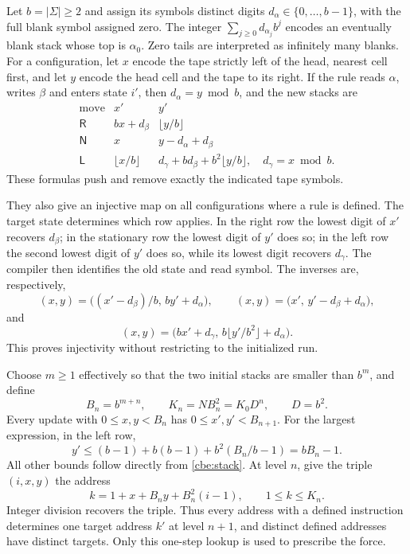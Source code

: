 Let $b=|\Sigma|\ge2$ and assign its symbols distinct digits
$d_\alpha\in\{0,\ldots,b-1\}$, with the full blank symbol assigned
zero.  The integer
$\sum_{j\ge0}d_{\alpha_j}b^j$ encodes an eventually blank stack whose
top is $\alpha_0$.  Zero tails are interpreted as infinitely many
blanks.  For a configuration, let $x$ encode the tape strictly left
of the head, nearest cell first, and let $y$ encode the head cell and
the tape to its right.  If the rule reads $\alpha$, writes $\beta$
and enters state $i'$, then $d_\alpha=y\bmod b$, and the new stacks are
\begin{equation}\label{cbe:stack}
\begin{array}{c|cc}
\text{move}&x'&y'\\ \hline
\mathsf R&bx+d_\beta&\lfloor y/b\rfloor\\
\mathsf N&x&y-d_\alpha+d_\beta\\
\mathsf L&\lfloor x/b\rfloor&
 d_\gamma+bd_\beta+b^2\lfloor y/b\rfloor,
 \quad d_\gamma=x\bmod b.
\end{array}
\end{equation}
These formulas push and remove exactly the indicated tape symbols.

They also give an injective map on all configurations where a rule
is defined.  The target state determines which row applies.  In the
right row the lowest digit of $x'$ recovers $d_\beta$; in the stationary
row the lowest digit of $y'$ does so; in the left row the second
lowest digit of $y'$ does so, while its lowest digit recovers
$d_\gamma$.  The compiler then identifies the old state and read
symbol.  The inverses are, respectively,
\[
 (x,y)=\bigl((x'-d_\beta)/b,\,by'+d_\alpha\bigr),\qquad
 (x,y)=\bigl(x',\,y'-d_\beta+d_\alpha\bigr),
\]
and
\[
 (x,y)=\bigl(bx'+d_\gamma,\,
                  b\lfloor y'/b^2\rfloor+d_\alpha\bigr).
\]
This proves injectivity without restricting to the initialized run.

Choose $m\ge1$ effectively so that the two initial stacks are smaller
than $b^m$, and define
\begin{equation}\label{cbe:counts}
 B_n=b^{m+n},\qquad K_n=NB_n^2=K_0D^n,\qquad D=b^2.
\end{equation}
Every update with $0\le x,y<B_n$ has $0\le x',y'<B_{n+1}$.
For the largest expression, in the left row,
\[
 y'\le(b-1)+b(b-1)+b^2(B_n/b-1)=bB_n-1.
\]
All other bounds follow directly from \eqref{cbe:stack}.
At level $n$, give the triple $(i,x,y)$ the address
\begin{equation}\label{cbe:address}
 k=1+x+B_ny+B_n^2(i-1),\qquad 1\le k\le K_n.
\end{equation}
Integer division recovers the triple.  Thus every address with a
defined instruction determines one target address $k'$ at level
$n+1$, and distinct defined addresses have distinct targets.
Only this one-step lookup is used to prescribe the force.

